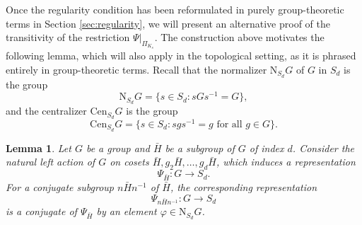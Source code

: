 \documentclass[10pt]{amsart}
\newtheorem{lemma}[theorem]{Lemma}
\theoremstyle{definition}
\begin{document}
Once the regularity condition has been reformulated in purely group-theoretic terms in Section \ref{sec:regularity}, we will present an alternative proof of the transitivity of the restriction  $\Psi|_{\Pi_{K_s}}$. 
The construction above motivates the following lemma, which will also apply in the topological setting, as it is phrased entirely in group-theoretic terms.
Recall that the normalizer $\mathrm{N}_{S_d}G$ of $G$ in $S_d$ is the group 
\[
  \mathrm{N}_{S_d}G=\{s \in S_d: sGs^{-1}=G\},
\]
and the centralizer $\mathrm{Cen}_{S_d}G$ is the group
\[
\mathrm{Cen}_{S_d}G=\{s \in S_d: sgs^{-1}=g \text{ for all } g\in G\}.
\]
\begin{lemma}
  \label{lemma:conjNorm}
Let $G$ be a group and $\bar{H}$ be a subgroup of $G$ of index $d$. Consider the natural left action of $G$ on cosets $\bar{H}, g_2 \bar{H}, \ldots, g_d \bar H$, which induces a representation
\[
  \Psi_{\bar H} \colon G \longrightarrow S_d. 
\]
For a conjugate subgroup $n\bar{H}n^{-1}$ of $\bar{H}$, the corresponding representation
\[
  \Psi_{n \bar H n^{-1}} \colon G \longrightarrow S_d
\]
is a conjugate of $\Psi_{\bar{H}}$ by an element $\varphi \in \mathrm{N}_{S_d}G$.
\end{lemma}
\end{document}
